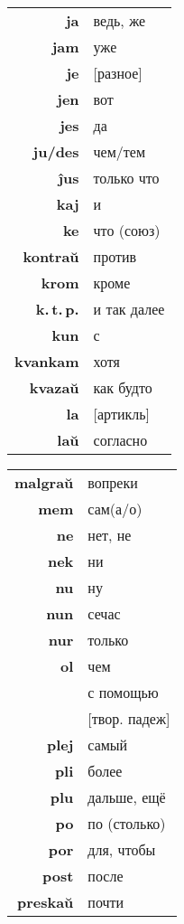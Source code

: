 \documentclass{article}
\begin{document}
\begin{tabular}{>{\bfseries}rl}
ja & ведь, же \\
jam & уже \\
je & {}[разное] \\
jen & вот \\
jes & да \\
ju/des & чем/тем \\
ĵus & только что \\
kaj & и \\
ke & что (союз) \\
kontraŭ & против \\
krom & кроме \\
k.\,t.\,p. & и так далее \\
kun & с \\
kvankam & хотя \\
kvazaŭ & как будто \\
la & {}[артикль] \\
laŭ & согласно \\
\end{tabular}
\hspace{-1.5em}
\begin{tabular}{>{\bfseries}rl}
malgraŭ & вопреки \\
mem & сам(а/о) \\
ne & нет, не \\
nek & ни \\
nu & ну \\
nun & сечас \\
nur & только \\
ol & чем \\
\multirow{2}{*}{per} & с помощью \\
& {}[твор. падеж] \\
plej & самый \\
pli & более \\
plu & дальше, ещё \\
po & по (столько) \\
por & для, чтобы \\
post & после \\
preskaŭ & почти \\
\end{tabular}
\hspace{-1em}
\end{document}
